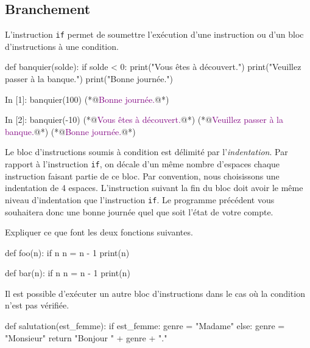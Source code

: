 \documentclass{magnolia}
\begin{document}
\subsection{Branchement}

L'instruction \verb_if_ permet de soumettre l'exécution d'une instruction ou d'un bloc d'instructions à une condition.

\begin{pythoncodeline}
def banquier(solde):
    if solde < 0:
        print("Vous êtes à découvert.")
        print("Veuillez passer à la banque.")
    print("Bonne journée.")
\end{pythoncodeline}
    
\begin{pythoncode}
In [1]: banquier(100)
(*@\textcolor{purple}{Bonne journée.}@*)

In [2]: banquier(-10)
(*@\textcolor{purple}{Vous êtes à découvert.}@*)
(*@\textcolor{purple}{Veuillez passer à la banque.}@*)
(*@\textcolor{purple}{Bonne journée.}@*)
\end{pythoncode}

\noindent Le bloc d'instructions soumis à condition est délimité par l'\emph{indentation}. Par rapport à l'instruction \verb_if_, on décale d'un même nombre d'espaces chaque instruction faisant partie de ce bloc. Par convention, nous choisissons une indentation de 4 espaces. L'instruction suivant la fin du bloc doit avoir le même niveau d'indentation que l'instruction \verb_if_. Le programme précédent vous souhaitera donc une bonne journée quel que soit l'état de votre compte.\\

\begin{exoUnique}
\exo Expliquer ce que font les deux fonctions suivantes.
\begin{pythoncodeline}
def foo(n):
    if n %
        n = n - 1
    print(n)

def bar(n):
    if n %
        n = n - 1
        print(n)
\end{pythoncodeline}
\end{exoUnique}
\bigskip

Il est possible d'exécuter un autre bloc d'instructions dans le cas où la condition n'est pas vérifiée.

\begin{pythoncodeline}
def salutation(est_femme):
    if est_femme:
        genre = "Madame"
    else:
        genre = "Monsieur"
    return "Bonjour " + genre + "."
\end{pythoncodeline}
\end{document}
